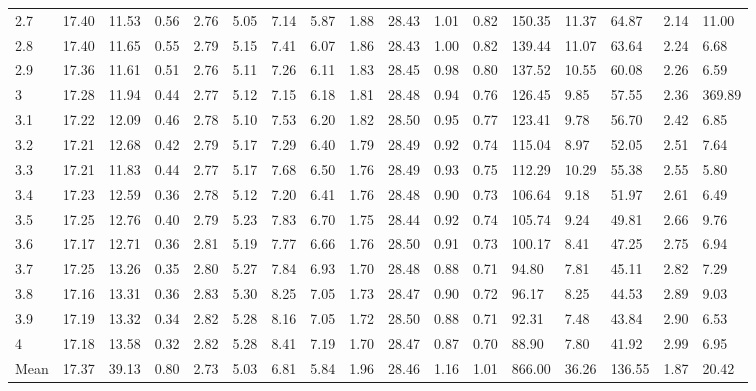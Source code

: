 \begin{adjustbox}{angle=90}
\begin{center}
\begin{tabular}{|l|llllllllllllllll|}
2.7&17.40&11.53&0.56&2.76&5.05&7.14&5.87&1.88&28.43&1.01&0.82&150.35&11.37&64.87&2.14&11.00  \\ 
2.8&17.40&11.65&0.55&2.79&5.15&7.41&6.07&1.86&28.43&1.00&0.82&139.44&11.07&63.64&2.24&6.68  \\ 
2.9&17.36&11.61&0.51&2.76&5.11&7.26&6.11&1.83&28.45&0.98&0.80&137.52&10.55&60.08&2.26&6.59  \\ 
3&17.28&11.94&0.44&2.77&5.12&7.15&6.18&1.81&28.48&0.94&0.76&126.45&9.85&57.55&2.36&369.89  \\ 
3.1&17.22&12.09&0.46&2.78&5.10&7.53&6.20&1.82&28.50&0.95&0.77&123.41&9.78&56.70&2.42&6.85  \\ 
3.2&17.21&12.68&0.42&2.79&5.17&7.29&6.40&1.79&28.49&0.92&0.74&115.04&8.97&52.05&2.51&7.64  \\ 
3.3&17.21&11.83&0.44&2.77&5.17&7.68&6.50&1.76&28.49&0.93&0.75&112.29&10.29&55.38&2.55&5.80  \\ 
3.4&17.23&12.59&0.36&2.78&5.12&7.20&6.41&1.76&28.48&0.90&0.73&106.64&9.18&51.97&2.61&6.49  \\ 
3.5&17.25&12.76&0.40&2.79&5.23&7.83&6.70&1.75&28.44&0.92&0.74&105.74&9.24&49.81&2.66&9.76  \\ 
3.6&17.17&12.71&0.36&2.81&5.19&7.77&6.66&1.76&28.50&0.91&0.73&100.17&8.41&47.25&2.75&6.94  \\ 
3.7&17.25&13.26&0.35&2.80&5.27&7.84&6.93&1.70&28.48&0.88&0.71&94.80&7.81&45.11&2.82&7.29  \\ 
3.8&17.16&13.31&0.36&2.83&5.30&8.25&7.05&1.73&28.47&0.90&0.72&96.17&8.25&44.53&2.89&9.03  \\ 
3.9&17.19&13.32&0.34&2.82&5.28&8.16&7.05&1.72&28.50&0.88&0.71&92.31&7.48&43.84&2.90&6.53  \\ 
4&17.18&13.58&0.32&2.82&5.28&8.41&7.19&1.70&28.47&0.87&0.70&88.90&7.80&41.92&2.99&6.95  \\ \hline \hline
Mean&17.37&39.13&0.80&2.73&5.03&6.81&5.84&1.96&28.46&1.16&1.01&866.00&36.26&136.55&1.87&20.42  \\ \hline
\end{tabular}
\end{center}
\end{adjustbox}





